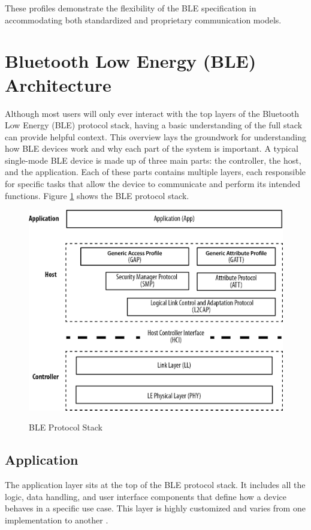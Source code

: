 These profiles demonstrate the flexibility of the BLE specification in accommodating both standardized and proprietary communication models.

\section{Bluetooth Low Energy (BLE) Architecture}

Although most users will only ever interact with the top layers of the Bluetooth Low Energy (BLE) protocol stack, having a basic understanding of the full stack can provide helpful context. This overview lays the groundwork for understanding how BLE devices work and why each part of the system is important. A typical single-mode BLE device is made up of three main parts: the controller, the host, and the application. Each of these parts contains multiple layers, each responsible for specific tasks that allow the device to communicate and perform its intended functions. Figure \ref{fig:bleprotocolstack} shows the BLE protocol stack.

\begin{figure}[h]
    \caption{BLE Protocol Stack}
    \includegraphics[scale=.7]{bleprotocolstack.png}
    \label{fig:bleprotocolstack}
    \end{figure}

\subsection{Application}

The application layer sits at the top of the BLE protocol stack. It includes all the logic, data handling, and user interface components that define how a device behaves in a specific use case. This layer is highly customized and varies from one implementation to another \cite{nextgenBLE}.

